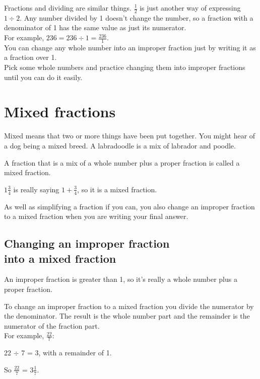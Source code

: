 \documentclass[16pt]{article}
\begin{document}
\begin{spacing}{1.25}
Fractions and dividing are similar things. $\frac{1}{2}$ is just another way of expressing $1 \div 2$. Any number divided by 1 doesn't change the number, so a fraction with a denominator of 1 has the same value as just its numerator.\\

For example, $236 = 236 \div 1 = \frac{236}{1}$.\\

You can change any whole number into an improper fraction just by writing it as a fraction over 1.\\

Pick some whole numbers and practice changing them into improper fractions until you can do it easily.

\pagebreak

\section{Mixed fractions}

Mixed means that two or more things have been put together. You might hear of a dog being a mixed breed. A labradoodle is a mix of labrador and poodle.

A fraction that is a mix of a whole number plus a proper fraction is called a mixed fraction.

$1\frac{3}{4}$ is really saying $1 + \frac{3}{4}$, so it is a mixed fraction.

As well as simplifying a fraction if you can, you also change an improper fraction to a mixed fraction when you are writing your final answer.

\subsection*{Changing an improper fraction \\into a mixed fraction}
An improper fraction is greater than 1, so it's really a whole number plus a proper fraction.

To change an improper fraction to a mixed fraction you divide the numerator by the denominator. The result is the whole number part and the remainder is the numerator of the fraction part.\\

For example, $\frac{22}{7}$:

22 $\div$ 7 = 3, with a remainder of 1.

So $\frac{22}{7}$ = $3 \frac{1}{7}$.\\


\end{spacing}
\end{document}
